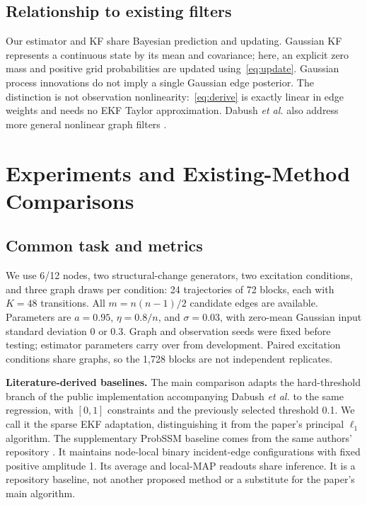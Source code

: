 \documentclass[journal]{IEEEtran}
\begin{document}
\subsection{Relationship to existing filters}
Our estimator and KF share Bayesian prediction and updating. Gaussian KF represents a continuous state by its mean and covariance; here, an explicit zero mass and positive grid probabilities are updated using~\eqref{eq:update}. Gaussian process innovations do not imply a single Gaussian edge posterior. The distinction is not observation nonlinearity:~\eqref{eq:derive} is exactly linear in edge weights and needs no EKF Taylor approximation. Dabush \emph{et al.} also address more general nonlinear graph filters \cite{dabush}.

\section{Experiments and Existing-Method Comparisons}
\subsection{Common task and metrics}
We use 6/12 nodes, two structural-change generators, two excitation conditions, and three graph draws per condition: 24 trajectories of 72 blocks, each with $K=48$ transitions. All $m=n(n-1)/2$ candidate edges are available. Parameters are $a=0.95$, $\eta=0.8/n$, and $\sigma=0.03$, with zero-mean Gaussian input standard deviation 0 or 0.3. Graph and observation seeds were fixed before testing; estimator parameters carry over from development. Paired excitation conditions share graphs, so the 1,728 blocks are not independent replicates.

\textbf{Literature-derived baselines.} The main comparison adapts the hard-threshold branch of the public implementation accompanying Dabush \emph{et al.} \cite{dabush,code} to the same regression, with $[0,1]$ constraints and the previously selected threshold 0.1. We call it the sparse EKF adaptation, distinguishing it from the paper's principal $\ell_1$ algorithm. The supplementary ProbSSM baseline comes from the same authors' repository \cite{code}. It maintains node-local binary incident-edge configurations with fixed positive amplitude 1. Its average and local-MAP readouts share inference. It is a repository baseline, not another proposed method or a substitute for the paper's main algorithm.
\end{document}

